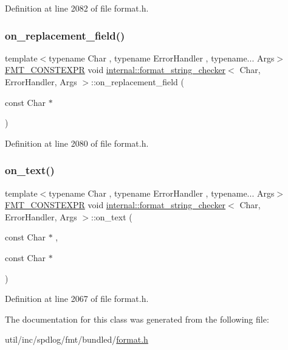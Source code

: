Definition at line 2082 of file format.\+h.

\mbox{\label{classinternal_1_1format__string__checker_a0d7bcf166939fea3198891cd0e574997}} 
\subsubsection{\texorpdfstring{on\+\_\+replacement\+\_\+field()}{on\_replacement\_field()}}
{\footnotesize\ttfamily template$<$typename Char , typename Error\+Handler , typename... Args$>$ \\
\hyperlink{core_8h_a69201cb276383873487bf68b4ef8b4cd}{F\+M\+T\+\_\+\+C\+O\+N\+S\+T\+E\+X\+PR} void \hyperlink{classinternal_1_1format__string__checker}{internal\+::format\+\_\+string\+\_\+checker}$<$ Char, Error\+Handler, Args $>$\+::on\+\_\+replacement\+\_\+field (\begin{DoxyParamCaption}\item[{const Char $\ast$}]{ }\end{DoxyParamCaption})\hspace{0.3cm}{\ttfamily [inline]}}



Definition at line 2080 of file format.\+h.

\mbox{\label{classinternal_1_1format__string__checker_a80292d0556871811a821bca796f770c3}} 
\subsubsection{\texorpdfstring{on\+\_\+text()}{on\_text()}}
{\footnotesize\ttfamily template$<$typename Char , typename Error\+Handler , typename... Args$>$ \\
\hyperlink{core_8h_a69201cb276383873487bf68b4ef8b4cd}{F\+M\+T\+\_\+\+C\+O\+N\+S\+T\+E\+X\+PR} void \hyperlink{classinternal_1_1format__string__checker}{internal\+::format\+\_\+string\+\_\+checker}$<$ Char, Error\+Handler, Args $>$\+::on\+\_\+text (\begin{DoxyParamCaption}\item[{const Char $\ast$}]{,  }\item[{const Char $\ast$}]{ }\end{DoxyParamCaption})\hspace{0.3cm}{\ttfamily [inline]}}



Definition at line 2067 of file format.\+h.



The documentation for this class was generated from the following file\+:\begin{DoxyCompactItemize}
\item 
util/inc/spdlog/fmt/bundled/\hyperlink{format_8h}{format.\+h}\end{DoxyCompactItemize}
